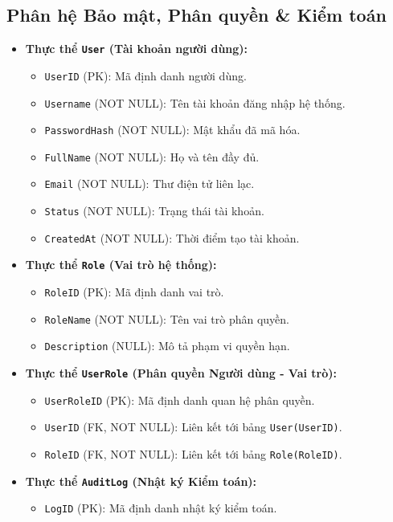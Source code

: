\subsection{Phân hệ Bảo mật, Phân quyền \& Kiểm toán}
\begin{itemize}[leftmargin=2em]
    \item \textbf{Thực thể \texttt{User} (Tài khoản người dùng):}
    \begin{itemize}
        \item \texttt{UserID} (PK): Mã định danh người dùng.
        \item \texttt{Username} (NOT NULL): Tên tài khoản đăng nhập hệ thống.
        \item \texttt{PasswordHash} (NOT NULL): Mật khẩu đã mã hóa.
        \item \texttt{FullName} (NOT NULL): Họ và tên đầy đủ.
        \item \texttt{Email} (NOT NULL): Thư điện tử liên lạc.
        \item \texttt{Status} (NOT NULL): Trạng thái tài khoản.
        \item \texttt{CreatedAt} (NOT NULL): Thời điểm tạo tài khoản.
    \end{itemize}
    \item \textbf{Thực thể \texttt{Role} (Vai trò hệ thống):}
    \begin{itemize}
        \item \texttt{RoleID} (PK): Mã định danh vai trò.
        \item \texttt{RoleName} (NOT NULL): Tên vai trò phân quyền.
        \item \texttt{Description} (NULL): Mô tả phạm vi quyền hạn.
    \end{itemize}
    \item \textbf{Thực thể \texttt{UserRole} (Phân quyền Người dùng - Vai trò):}
    \begin{itemize}
        \item \texttt{UserRoleID} (PK): Mã định danh quan hệ phân quyền.
        \item \texttt{UserID} (FK, NOT NULL): Liên kết tới bảng \texttt{User(UserID)}.
        \item \texttt{RoleID} (FK, NOT NULL): Liên kết tới bảng \texttt{Role(RoleID)}.
    \end{itemize}
    \item \textbf{Thực thể \texttt{AuditLog} (Nhật ký Kiểm toán):}
    \begin{itemize}
        \item \texttt{LogID} (PK): Mã định danh nhật ký kiểm toán.

\end{itemize}
\end{itemize}

